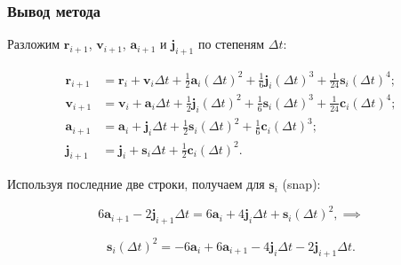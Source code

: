 \begin{frame}
\frametitle{Вывод метода}

Разложим $ \mathbf{r}_{i+1} $, $ \mathbf{v}_{i+1} $, $ \mathbf{a}_{i+1} $ и $ \mathbf{j}_{i+1} $ по степеням $ \Delta t $:

\su\su
\begin{equation}
\begin{split}
  \mathbf{r}_{i+1} & = \mathbf{r}_i + \mathbf{v}_i \Delta t + \tfrac{1}{2} \mathbf{a}_i (\Delta t)^2 + \tfrac{1}{6} \mathbf{j}_i (\Delta t)^3 + \tfrac{1}{24} \mathbf{s}_i (\Delta t)^4; \\
  \mathbf{v}_{i+1} & = \mathbf{v}_i + \mathbf{a}_i \Delta t + \tfrac{1}{2} \mathbf{j}_i (\Delta t)^2 + \tfrac{1}{6} \mathbf{s}_i (\Delta t)^3 + \tfrac{1}{24} \mathbf{c}_i (\Delta t)^4; \\
  \mathbf{a}_{i+1} & = \mathbf{a}_i + \mathbf{j}_i \Delta t + \tfrac{1}{2} \mathbf{s}_i (\Delta t)^2 + \tfrac{1}{6} \mathbf{c}_i (\Delta t)^3; \\
  \mathbf{j}_{i+1} & = \mathbf{j}_i + \mathbf{s}_i \Delta t + \tfrac{1}{2} \mathbf{c}_i (\Delta t)^2.
\end{split}
\end{equation}

Используя последние две строки, получаем для $ \mathbf{s}_i $ (snap):

\su
\begin{equation*}
  6 \mathbf{a}_{i+1} - 2 \mathbf{j}_{i+1} \Delta t = 6 \mathbf{a}_i + 4 \mathbf{j}_i \Delta t + \mathbf{s}_i (\Delta t)^2, \implies
\end{equation*}

\su\su\su
\begin{equation}
  \mathbf{s}_i (\Delta t)^2 = -6 \mathbf{a}_i + 6 \mathbf{a}_{i+1} - 4 \mathbf{j}_i \Delta t - 2 \mathbf{j}_{i+1} \Delta t.
\end{equation}

\end{frame}

